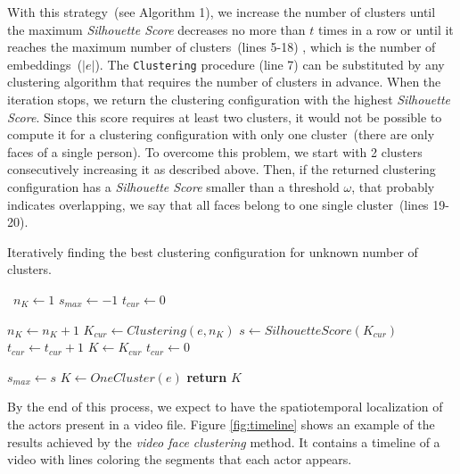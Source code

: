 With this strategy~(see Algorithm 1), we increase the number of clusters until the maximum \emph{Silhouette Score} decreases no more than $t$ times in a row or until it reaches the maximum number of clusters~(lines 5-18)
, which is the number of embeddings~($|e|$).
The \texttt{Clustering} procedure (line 7)
can be substituted by any clustering algorithm that requires the number of clusters in advance.
When the iteration stops, we return the clustering configuration with the highest \emph{Silhouette Score}.
Since this score requires at least two clusters, it would not be possible to compute it for a clustering configuration with only one cluster~(there are only faces of a single person).
To overcome this problem, we start with 2 clusters consecutively increasing it as described above. Then, if the returned clustering configuration has a \emph{Silhouette Score} smaller than a threshold $\omega$, that probably indicates overlapping, we say that all faces belong to one single cluster~(lines 19-20). 

\begin{algorithm}
\small
\caption{Iteratively finding the best clustering configuration for unknown number of clusters.}\label{clustering_alg}
\begin{algorithmic}[1]
\
\State $n_K\gets 1$
\State $s_{max}\gets -1$
\State $t_{cur}\gets 0$ 

    \State $n_K\gets n_K+1$
    \State $K_{cur}\gets Clustering(e, n_K)$
    \State $s \gets SilhouetteScore(K_{cur})$
        \State $t_{cur}\gets t_{cur}+1$
    \Else
        \State $K\gets K_{cur}$
        \State $t_{cur}\gets 0$
        
            \State $s_{max} \gets s$
        \EndIf
    \EndIf
\EndWhile
{}
    \State $K\gets OneCluster(e)$
\EndIf
\State \textbf{return} $K$
\EndProcedure
\end{algorithmic}
\end{algorithm}


By the end of this process, we expect to have the spatiotemporal localization of the actors present in a video file.
Figure \ref{fig:timeline} shows an example of the results achieved by the \emph{video face clustering} method. It contains a timeline of a video with lines coloring the segments that each actor appears.

